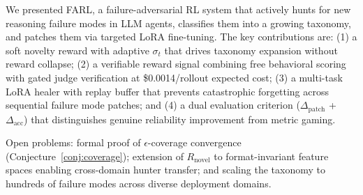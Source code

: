 \documentclass[11pt,a4paper]{article}
\begin{document}
We presented FARL, a failure-adversarial RL system that actively hunts for
new reasoning failure modes in LLM agents, classifies them into a growing
taxonomy, and patches them via targeted LoRA fine-tuning. The key contributions
are: (1) a soft novelty reward with adaptive $\sigma_t$ that drives taxonomy
expansion without reward collapse; (2) a verifiable reward signal combining
free behavioral scoring with gated judge verification at \$0.0014/rollout
expected cost; (3) a multi-task LoRA healer with replay buffer that prevents
catastrophic forgetting across sequential failure mode patches; and (4) a dual
evaluation criterion ($\Delta_\text{patch}$ + $\Delta_\text{acc}$) that
distinguishes genuine reliability improvement from metric gaming.

Open problems: formal proof of $\epsilon$-coverage convergence
(Conjecture~\ref{conj:coverage}); extension of $R_\text{novel}$ to
format-invariant feature spaces enabling cross-domain hunter transfer;
and scaling the taxonomy to hundreds of failure modes across diverse
deployment domains.
\end{document}
